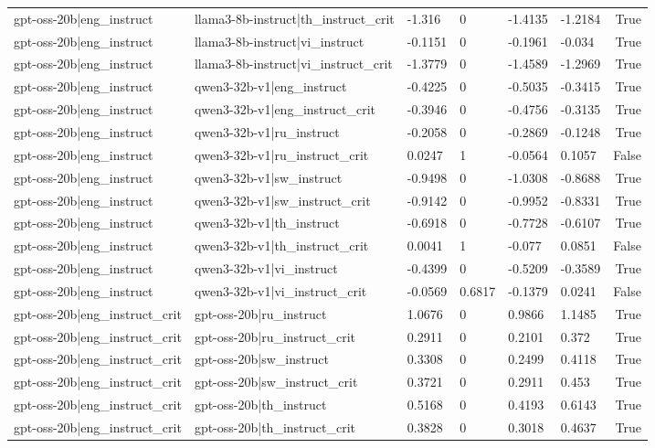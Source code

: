\begin{table}
\begin{tabular}{llllllr}
gpt-oss-20b|eng_instruct & llama3-8b-instruct|th_instruct_crit & -1.316 & 0 & -1.4135 & -1.2184 & True \\
gpt-oss-20b|eng_instruct & llama3-8b-instruct|vi_instruct & -0.1151 & 0 & -0.1961 & -0.034 & True \\
gpt-oss-20b|eng_instruct & llama3-8b-instruct|vi_instruct_crit & -1.3779 & 0 & -1.4589 & -1.2969 & True \\
gpt-oss-20b|eng_instruct & qwen3-32b-v1|eng_instruct & -0.4225 & 0 & -0.5035 & -0.3415 & True \\
gpt-oss-20b|eng_instruct & qwen3-32b-v1|eng_instruct_crit & -0.3946 & 0 & -0.4756 & -0.3135 & True \\
gpt-oss-20b|eng_instruct & qwen3-32b-v1|ru_instruct & -0.2058 & 0 & -0.2869 & -0.1248 & True \\
gpt-oss-20b|eng_instruct & qwen3-32b-v1|ru_instruct_crit & 0.0247 & 1 & -0.0564 & 0.1057 & False \\
gpt-oss-20b|eng_instruct & qwen3-32b-v1|sw_instruct & -0.9498 & 0 & -1.0308 & -0.8688 & True \\
gpt-oss-20b|eng_instruct & qwen3-32b-v1|sw_instruct_crit & -0.9142 & 0 & -0.9952 & -0.8331 & True \\
gpt-oss-20b|eng_instruct & qwen3-32b-v1|th_instruct & -0.6918 & 0 & -0.7728 & -0.6107 & True \\
gpt-oss-20b|eng_instruct & qwen3-32b-v1|th_instruct_crit & 0.0041 & 1 & -0.077 & 0.0851 & False \\
gpt-oss-20b|eng_instruct & qwen3-32b-v1|vi_instruct & -0.4399 & 0 & -0.5209 & -0.3589 & True \\
gpt-oss-20b|eng_instruct & qwen3-32b-v1|vi_instruct_crit & -0.0569 & 0.6817 & -0.1379 & 0.0241 & False \\
gpt-oss-20b|eng_instruct_crit & gpt-oss-20b|ru_instruct & 1.0676 & 0 & 0.9866 & 1.1485 & True \\
gpt-oss-20b|eng_instruct_crit & gpt-oss-20b|ru_instruct_crit & 0.2911 & 0 & 0.2101 & 0.372 & True \\
gpt-oss-20b|eng_instruct_crit & gpt-oss-20b|sw_instruct & 0.3308 & 0 & 0.2499 & 0.4118 & True \\
gpt-oss-20b|eng_instruct_crit & gpt-oss-20b|sw_instruct_crit & 0.3721 & 0 & 0.2911 & 0.453 & True \\
gpt-oss-20b|eng_instruct_crit & gpt-oss-20b|th_instruct & 0.5168 & 0 & 0.4193 & 0.6143 & True \\
gpt-oss-20b|eng_instruct_crit & gpt-oss-20b|th_instruct_crit & 0.3828 & 0 & 0.3018 & 0.4637 & True \\

\end{tabular}
\end{table}
